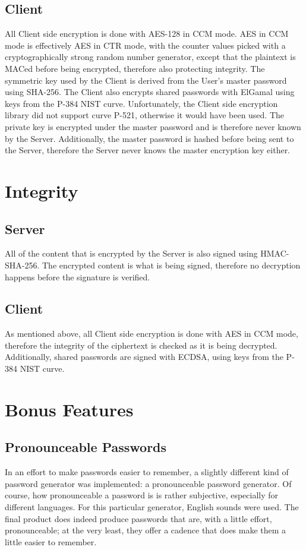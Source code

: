\documentclass{article}
\begin{document}
\subsection{Client}
\label{sub:confidentiality_client}
\par All Client side encryption is done with AES-128 in CCM mode. AES in CCM mode is effectively AES in CTR mode, with the counter values picked with a cryptographically strong random number generator, except that the plaintext is MACed before being encrypted, therefore also protecting integrity. The symmetric key used by the Client is derived from the User's master password using SHA-256. The Client also encrypts shared passwords with ElGamal using keys from the P-384 NIST curve. Unfortunately, the Client side encryption library did not support curve P-521, otherwise it would have been used. The private key is encrypted under the master password and is therefore never known by the Server. Additionally, the master password is hashed before being sent to the Server, therefore the Server never knows the master encryption key either.

\section{Integrity}
\subsection{Server}
\par All of the content that is encrypted by the Server is also signed using HMAC-SHA-256. The encrypted content is what is being signed, therefore no decryption happens before the signature is verified.

\subsection{Client}
\par As mentioned above, all Client side encryption is done with AES in CCM mode, therefore the integrity of the ciphertext is checked as it is being decrypted. Additionally, shared passwords are signed with ECDSA, using keys from the P-384 NIST curve.

\section{Bonus Features}
\subsection{Pronounceable Passwords}
\par In an effort to make passwords easier to remember, a slightly different kind of password generator was implemented: a pronounceable password generator. Of course, how pronounceable a password is is rather subjective, especially for different languages. For this particular generator, English sounds were used. The final product does indeed produce passwords that are, with a little effort, pronounceable; at the very least, they offer a cadence that does make them a little easier to remember.
\end{document}
